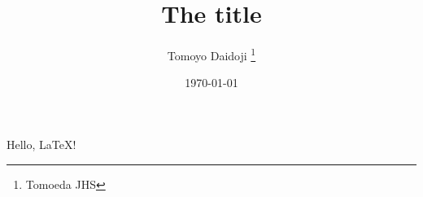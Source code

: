 \documentclass[a4paper,11pt]{ltjsarticle}
\title{The title}
\author{Tomoyo Daidoji \thanks{Tomoeda JHS}}
\date{\today}
\begin{document}
\maketitle
  Hello, \LaTeX!

% 
% 
\end{document}
